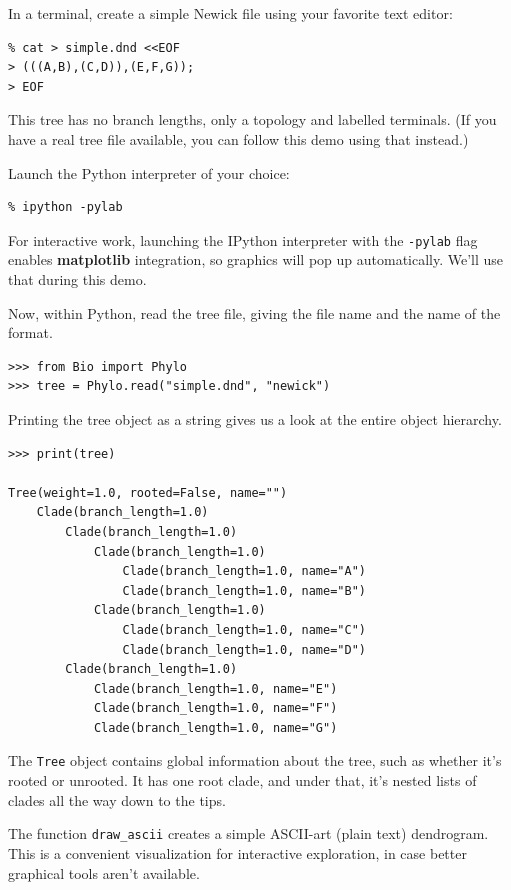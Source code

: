 \documentclass{report}
\begin{document}
In a terminal, create a simple Newick file using your favorite text editor:

\begin{verbatim}
% cat > simple.dnd <<EOF
> (((A,B),(C,D)),(E,F,G));
> EOF
\end{verbatim}

This tree has no branch lengths, only a topology and labelled terminals. (If you have a real
tree file available, you can follow this demo using that instead.)

Launch the Python interpreter of your choice:

\begin{verbatim}
% ipython -pylab
\end{verbatim}

For interactive work, launching the IPython interpreter with the \verb|-pylab| flag enables
\textbf{matplotlib} integration, so graphics will pop up automatically. We'll use that during
this demo.

Now, within Python, read the tree file, giving the file name and the name of the format.

\begin{verbatim}
>>> from Bio import Phylo
>>> tree = Phylo.read("simple.dnd", "newick")
\end{verbatim}

Printing the tree object as a string gives us a look at the entire object hierarchy.

\begin{verbatim}
>>> print(tree)

Tree(weight=1.0, rooted=False, name="")
    Clade(branch_length=1.0)
        Clade(branch_length=1.0)
            Clade(branch_length=1.0)
                Clade(branch_length=1.0, name="A")
                Clade(branch_length=1.0, name="B")
            Clade(branch_length=1.0)
                Clade(branch_length=1.0, name="C")
                Clade(branch_length=1.0, name="D")
        Clade(branch_length=1.0)
            Clade(branch_length=1.0, name="E")
            Clade(branch_length=1.0, name="F")
            Clade(branch_length=1.0, name="G")
\end{verbatim}

The \texttt{Tree} object contains global information about the tree, such as whether it's
rooted or unrooted. It has one root clade, and under that, it's nested lists of clades all the
way down to the tips.

The function \verb|draw_ascii| creates a simple ASCII-art (plain text) dendrogram.  This is a
convenient visualization for interactive exploration, in case better graphical tools aren't
available.
\end{document}

